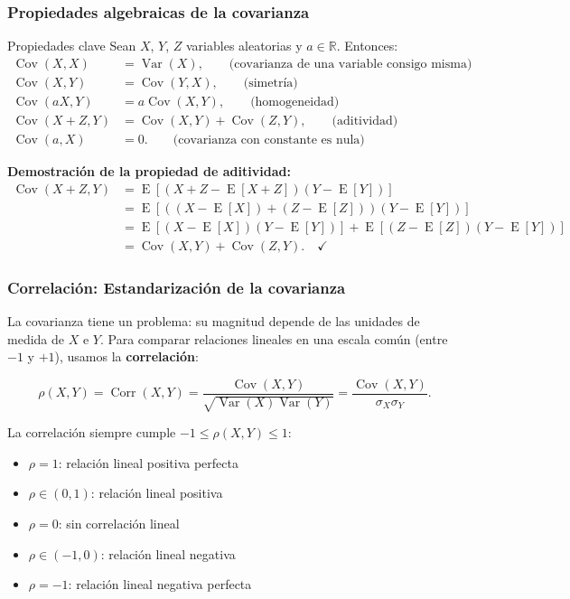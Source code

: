 \documentclass[11pt,a4paper]{article}
\DeclareMathOperator{\E}{E}
\DeclareMathOperator{\Var}{Var}
\DeclareMathOperator{\Cov}{Cov}
\DeclareMathOperator{\Corr}{Corr}
\begin{document}
\subsubsection*{Propiedades algebraicas de la covarianza}

\begin{propiedad}{Propiedades clave}
Sean \(X\), \(Y\), \(Z\) variables aleatorias y \(a\in\mathbb{R}\). Entonces:
\begin{align}
\Cov(X,X) &= \Var(X), \quad\quad\text{(covarianza de una variable consigo misma)}\\
\Cov(X,Y) &= \Cov(Y,X), \quad\quad\text{(simetría)}\\
\Cov(aX,Y) &= a\Cov(X,Y), \quad\quad\text{(homogeneidad)}\\
\Cov(X+Z,Y) &= \Cov(X,Y)+\Cov(Z,Y), \quad\quad\text{(aditividad)}\\
\Cov(a,X) &= 0. \quad\quad\text{(covarianza con constante es nula)}
\end{align}
\end{propiedad}

\noindent\textbf{Demostración de la propiedad de aditividad:}
\begin{align}
\Cov(X+Z,Y) &= \E[(X+Z-\E[X+Z])(Y-\E[Y])]\\
&= \E[((X-\E[X])+(Z-\E[Z]))(Y-\E[Y])]\\
&= \E[(X-\E[X])(Y-\E[Y])] + \E[(Z-\E[Z])(Y-\E[Y])]\\
&= \Cov(X,Y) + \Cov(Z,Y). \quad\checkmark
\end{align}

\subsubsection*{Correlación: Estandarización de la covarianza}

La covarianza tiene un problema: su magnitud depende de las unidades de medida de \(X\) e \(Y\). Para comparar relaciones lineales en una escala común (entre \(-1\) y \(+1\)), usamos la \textbf{correlación}:

\[
\boxed{\rho(X,Y) = \Corr(X,Y)=\frac{\Cov(X,Y)}{\sqrt{\Var(X)\Var(Y)}}=\frac{\Cov(X,Y)}{\sigma_X\sigma_Y}}.
\]

La correlación siempre cumple \(-1\le\rho(X,Y)\le 1\):
\begin{itemize}
\item \(\rho=1\): relación lineal positiva perfecta
\item \(\rho\in(0,1)\): relación lineal positiva
\item \(\rho=0\): sin correlación lineal
\item \(\rho\in(-1,0)\): relación lineal negativa
\item \(\rho=-1\): relación lineal negativa perfecta
\end{itemize}
\end{document}
